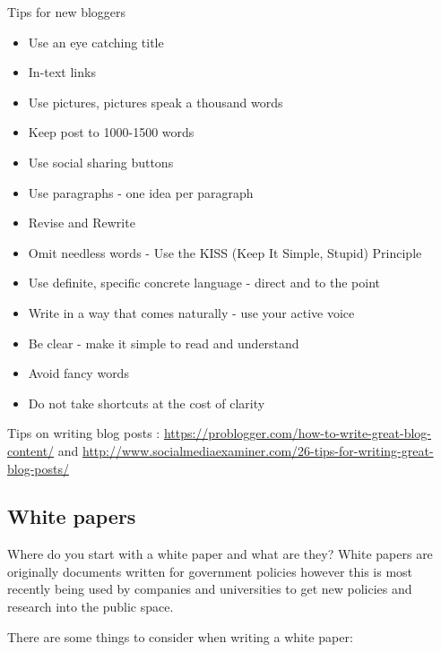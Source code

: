 \documentclass[]{book}
\providecommand{\tightlist}{%
  \setlength{\itemsep}{0pt}\setlength{\parskip}{0pt}}
\theoremstyle{definition}
\theoremstyle{definition}
\theoremstyle{remark}
\begin{document}
Tips for new bloggers

\begin{itemize}
\tightlist
\item
  Use an eye catching title
\item
  In-text links
\item
  Use pictures, pictures speak a thousand words
\item
  Keep post to 1000-1500 words
\item
  Use social sharing buttons
\item
  Use paragraphs - one idea per paragraph
\item
  Revise and Rewrite
\item
  Omit needless words - Use the KISS (Keep It Simple, Stupid) Principle
\item
  Use definite, specific concrete language - direct and to the point
\item
  Write in a way that comes naturally - use your active voice
\item
  Be clear - make it simple to read and understand
\item
  Avoid fancy words
\item
  Do not take shortcuts at the cost of clarity
\end{itemize}

Tips on writing blog posts :
\url{https://problogger.com/how-to-write-great-blog-content/} and
\url{http://www.socialmediaexaminer.com/26-tips-for-writing-great-blog-posts/}

\subsection{White papers}\label{white-papers}

Where do you start with a white paper and what are they? White papers
are originally documents written for government policies however this is
most recently being used by companies and universities to get new
policies and research into the public space.

There are some things to consider when writing a white paper:
\end{document}
